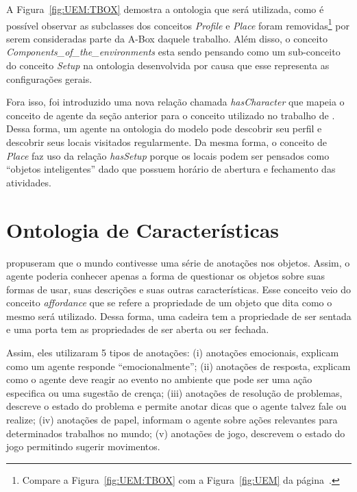 A Figura~\ref{fig:UEM:TBOX} demostra a ontologia que será utilizada, como é
possível observar as subclasses dos conceitos \emph{Profile} e \emph{Place}
foram removidas\footnote{Compare a Figura~\ref{fig:UEM:TBOX} com a
Figura~\ref{fig:UEM} da página~\pageref{fig:UEM}.} por serem consideradas parte
da A-Box daquele trabalho. Além disso, o conceito
\emph{Components\_of\_the\_environments} esta sendo pensando como um
sub-conceito do conceito \emph{Setup} na ontologia desenvolvida por causa que
esse representa as configurações gerais.

Fora isso, foi introduzido uma nova relação chamada \emph{hasCharacter} que
mapeia o conceito de agente da seção anterior para o conceito utilizado no
trabalho de \citet{paiva2005ontology}. Dessa forma, um agente na ontologia do
modelo \occ pode descobrir seu perfil e descobrir seus locais visitados
regularmente. Da mesma forma, o conceito de \emph{Place} faz uso da relação
\emph{hasSetup} porque os locais podem ser pensados como ``objetos
inteligentes'' dado que possuem horário de abertura e fechamento das
atividades.


\section{Ontologia de Características} \label{cap:tp:odp}

\citet{doyle1998annotated} propuseram que o mundo contivesse uma série de
anotações nos objetos. Assim, o agente poderia conhecer apenas a forma de
questionar os objetos sobre suas formas de usar, suas descrições e suas outras
características. Esse conceito veio do conceito \emph{affordance} que se
refere a propriedade de um objeto que dita como o mesmo será utilizado.
Dessa forma, uma cadeira tem a propriedade de ser sentada e uma porta tem as
propriedades de ser aberta ou ser fechada.

Assim, eles utilizaram 5 tipos de anotações: (i) anotações emocionais,
explicam como um agente responde ``emocionalmente''; (ii) anotações de
resposta, explicam como o agente deve reagir ao evento no ambiente que pode ser
uma ação especifica ou uma sugestão de crença; (iii) anotações de resolução de
problemas, descreve o estado do problema e permite anotar dicas que o agente
talvez fale ou realize; (iv) anotações de papel, informam o agente sobre ações
relevantes para determinados trabalhos no mundo; (v) anotações de jogo,
descrevem o estado do jogo permitindo sugerir movimentos.

